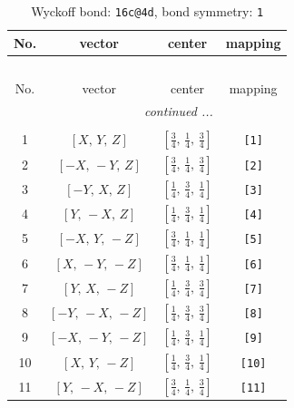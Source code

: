 \documentclass[fleqn,8pt]{jsarticle}
\begin{document}
\begin{longtable}{cccc}
\caption{Wyckoff bond: {\tt 16c@4d}, bond symmetry: {\tt 1}}
 \\
 \hline \hline
No. & vector & center & mapping \\ \hline \endfirsthead

\multicolumn{3}{l}{\tablename\ \thetable{}} \\
 \hline \hline
No. & vector & center & mapping \\ \hline \endhead

 \hline \hline
\multicolumn{3}{r}{\footnotesize\it continued ...} \\ \endfoot

 \hline \hline
\multicolumn{3}{r}{} \\ \endlastfoot

1 & $\left[ X,\, Y,\, Z \right]$ & $\left[ \frac{3}{4},\, \frac{1}{4},\, \frac{3}{4} \right]$ & {\tt [1]} \\ \hline
2 & $\left[ - X,\, - Y,\, Z \right]$ & $\left[ \frac{3}{4},\, \frac{1}{4},\, \frac{3}{4} \right]$ & {\tt [2]} \\ \hline
3 & $\left[ - Y,\, X,\, Z \right]$ & $\left[ \frac{1}{4},\, \frac{3}{4},\, \frac{1}{4} \right]$ & {\tt [3]} \\ \hline
4 & $\left[ Y,\, - X,\, Z \right]$ & $\left[ \frac{1}{4},\, \frac{3}{4},\, \frac{1}{4} \right]$ & {\tt [4]} \\ \hline
5 & $\left[ - X,\, Y,\, - Z \right]$ & $\left[ \frac{3}{4},\, \frac{1}{4},\, \frac{1}{4} \right]$ & {\tt [5]} \\ \hline
6 & $\left[ X,\, - Y,\, - Z \right]$ & $\left[ \frac{3}{4},\, \frac{1}{4},\, \frac{1}{4} \right]$ & {\tt [6]} \\ \hline
7 & $\left[ Y,\, X,\, - Z \right]$ & $\left[ \frac{1}{4},\, \frac{3}{4},\, \frac{3}{4} \right]$ & {\tt [7]} \\ \hline
8 & $\left[ - Y,\, - X,\, - Z \right]$ & $\left[ \frac{1}{4},\, \frac{3}{4},\, \frac{3}{4} \right]$ & {\tt [8]} \\ \hline
9 & $\left[ - X,\, - Y,\, - Z \right]$ & $\left[ \frac{1}{4},\, \frac{3}{4},\, \frac{1}{4} \right]$ & {\tt [9]} \\ \hline
10 & $\left[ X,\, Y,\, - Z \right]$ & $\left[ \frac{1}{4},\, \frac{3}{4},\, \frac{1}{4} \right]$ & {\tt [10]} \\ \hline
11 & $\left[ Y,\, - X,\, - Z \right]$ & $\left[ \frac{3}{4},\, \frac{1}{4},\, \frac{3}{4} \right]$ & {\tt [11]} \\ \hline

\end{longtable}
\end{document}

